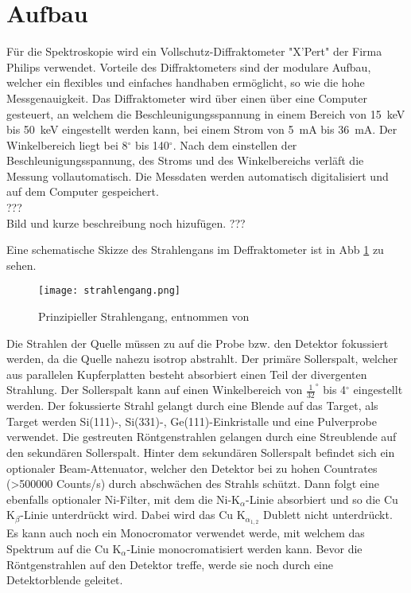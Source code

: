 \section{Aufbau}
F\"ur die Spektroskopie wird ein Vollschutz-Diffraktometer "X'Pert" der Firma Philips verwendet.
Vorteile des Diffraktometers sind der modulare Aufbau, welcher ein flexibles und einfaches handhaben erm\"oglicht, so wie die hohe Messgenauigkeit.
Das Diffraktometer wird \"uber einen \"uber eine Computer gesteuert, an welchem die Beschleunigungsspannung in einem Bereich von \SI{15}{keV} bis \SI{50}{keV} eingestellt werden kann, bei einem Strom von \SI{5}{mA} bis \SI{36}{mA}.
Der Winkelbereich liegt bei 8$^\circ$ bis 140$^\circ$.
Nach dem einstellen der Beschleunigungsspannung, des Stroms und des Winkelbereichs verl\"aft die Messung vollautomatisch.
Die Messdaten werden automatisch digitalisiert und auf dem Computer gespeichert.
\\
??? \\
Bild und kurze beschreibung noch hizuf\"ugen.  \linebreak
??? \linebreak

Eine schematische Skizze des Strahlengans im Deffraktometer ist in Abb \ref{fig:strahlengang} zu sehen.
\vspace{1cm}
\begin{figure}[H]
	\centering
  \texttt{[image: strahlengang.png]}
	\caption{Prinzipieller Strahlengang, entnommen von \cite{anleitung}}
	\label{fig:strahlengang}
\end{figure}

Die Strahlen der Quelle m\"ussen zu auf die Probe bzw. den Detektor fokussiert werden, da die Quelle nahezu isotrop abstrahlt. Der prim\"are Sollerspalt, welcher aus parallelen Kupferplatten besteht absorbiert einen Teil der divergenten Strahlung.
Der Sollerspalt kann auf einen Winkelbereich von $\frac{1}{32}^\circ$ bis 4$^\circ$ eingestellt werden.
Der fokussierte Strahl gelangt durch eine Blende auf das Target, als Target werden Si(111)-, Si(331)-, Ge(111)-Einkristalle und eine Pulverprobe verwendet.
Die gestreuten R\"ontgenstrahlen gelangen durch eine Streublende auf den sekund\"aren Sollerspalt.
Hinter dem sekund\"aren Sollerspalt befindet sich ein optionaler Beam-Attenuator, welcher den Detektor bei zu hohen Countrates (>500000 Counts/s) durch abschw\"achen des Strahls sch\"utzt.
Dann folgt eine ebenfalls optionaler Ni-Filter, mit dem die Ni-K$_\alpha$-Linie absorbiert und so die Cu K$_\beta$-Linie unterdr\"uckt wird. Dabei wird das Cu K$_{\alpha_{1,2}}$ Dublett nicht unterdr\"uckt.
Es kann auch noch ein Monocromator verwendet werde, mit welchem das Spektrum auf die Cu K$_\alpha$-Linie monocromatisiert werden kann.
Bevor die R\"ontgenstrahlen auf den Detektor treffe, werde sie noch durch eine Detektorblende geleitet.

